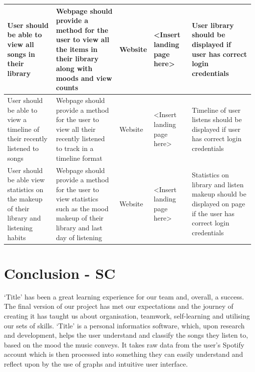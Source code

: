 \documentclass[10pt, notitlepage]{report}
\begin{document}
\begin{center}
\begin{longtable}{| p{2.5cm} | p{6cm} | p{2cm} | p{2cm} | p{2.5cm} | }
\hline
User should be able to view all songs in their library&
Webpage should provide a method for the user to view all the items in their library along with moods and view counts&
Website&
<Insert landing page here>&
User library should be displayed if user has correct login credentials \\
\hline
User should be able to view a timeline of their recently listened to songs&
Webpage should provide a method for the user to view all their recently listened to track in a timeline format&
Website&
<Insert landing page here>&
Timeline of user listens should be displayed if user has correct login credentials \\
\hline
User should be able view statistics on the makeup of their library and listening habits&
Webpage should provide a method for the user to view statistics such as the mood makeup of their library and last day of listening&
Website&
<Insert landing page here>&
Statistics on library and listen makeup should be displayed on page if the user has correct login credentials \\
\hline


\end{longtable}

\end{center}

\chapter{Conclusion  - SC}

‘Title’ has been a great learning experience for our team and, overall, a success. The final version of our project has met our expectations and the journey of creating it has taught us about organisation, teamwork, self-learning and utilising our sets of skills. ‘Title’ is a personal informatics software, which, upon research and development, helps the user understand and classify the songs they listen to, based on the mood the music conveys. It takes raw data from the user’s Spotify account which is then processed into something they can easily understand and reflect upon by the use of graphs and intuitive user interface. 
\end{document}
